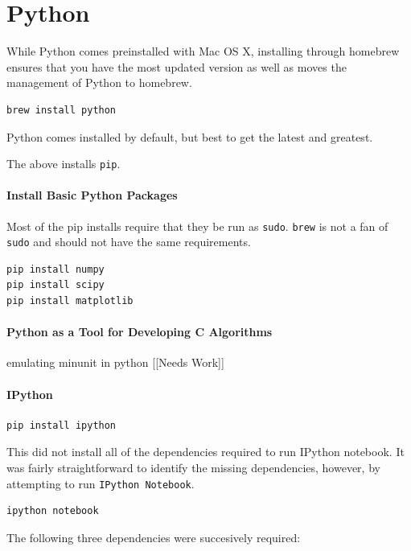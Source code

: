 \documentclass[12pt,]{book}
\let\oldparagraph\paragraph
\renewcommand{\paragraph}[1]{\oldparagraph{#1}\mbox{}}
\begin{document}
\section{Python}\label{python}

While Python comes preinstalled with Mac OS X, installing through
homebrew ensures that you have the most updated version as well as moves
the management of Python to homebrew.

\begin{verbatim}
brew install python 
\end{verbatim}

Python comes installed by default, but best to get the latest and
greatest.

The above installs \texttt{pip}.

\paragraph{Install Basic Python Packages}

Most of the pip installs require that they be run as \texttt{sudo}.
\texttt{brew} is not a fan of \texttt{sudo} and should not have the same
requirements.

\begin{verbatim}
pip install numpy
pip install scipy
pip install matplotlib
\end{verbatim}

\paragraph{Python as a Tool for Developing C Algorithms}

emulating minunit in python {[}{[}Needs Work{]}{]} \paragraph{IPython}

\begin{verbatim}
pip install ipython
\end{verbatim}

This did not install all of the dependencies required to run IPython
notebook. It was fairly straightforward to identify the missing
dependencies, however, by attempting to run \texttt{IPython\ Notebook}.

\begin{verbatim}
ipython notebook 
\end{verbatim}

The following three dependencies were succesively required:
\end{document}
